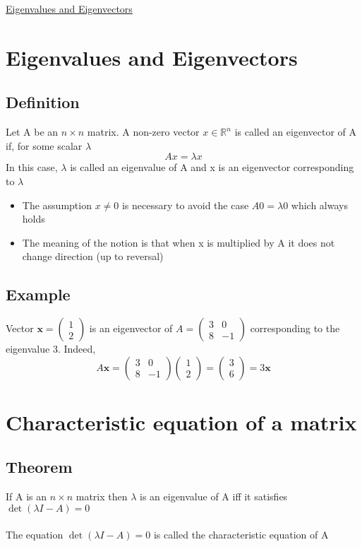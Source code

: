 \documentclass{article}[18pt]
\begin{document}
\begin{center}
\underline{\huge Eigenvalues and Eigenvectors}
\end{center}
\section{Eigenvalues and Eigenvectors}
\subsection{Definition}
Let A be an $n\times n$ matrix. A non-zero vector $x\in \mathbb{R}^n$ is called an eigenvector of A if, for some scalar $\lambda$
$$Ax=\lambda x$$
In this case, $\lambda$ is called an eigenvalue of A and x is an eigenvector corresponding to $\lambda$
\begin{itemize}
	\item The assumption $x\neq 0$ is necessary to avoid the case $A0=\lambda0$ which always holds
	\item The meaning of the notion is that when x is multiplied by A it does not change direction (up to reversal)
\end{itemize}
\subsection{Example}
Vector $\mathbf{x}=\left( \begin{array}{l}{1} \\ {2}\end{array}\right)$ is an eigenvector of $A=\left( \begin{array}{rr}{3} & {0} \\ {8} & {-1}\end{array}\right)$ corresponding to the eigenvalue 3. Indeed,
$$A \mathbf{x}=\left( \begin{array}{rr}{3} & {0} \\ {8} & {-1}\end{array}\right) \left( \begin{array}{l}{1} \\ {2}\end{array}\right)=\left( \begin{array}{l}{3} \\ {6}\end{array}\right)=3 \mathbf{x}$$
\section{Characteristic equation of a matrix}
\subsection{Theorem}
If A is an $n\times n$ matrix then $\lambda$ is an eigenvalue of A iff it satisfies $\operatorname{det}(\lambda I-A)=0$\\
\\
The equation $\operatorname{det}(\lambda I-A)=0$ is called the characteristic equation of A
\end{document}
